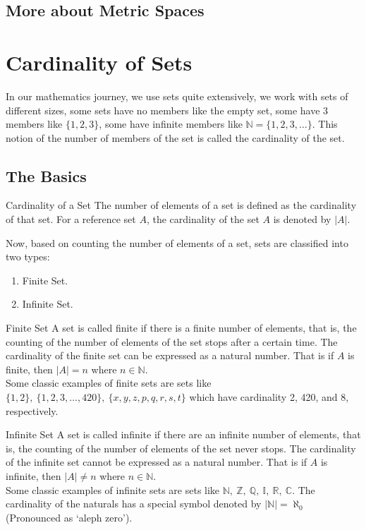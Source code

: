 \subsection{More about Metric Spaces}
\section{Cardinality of Sets}
In our mathematics journey, we use sets quite extensively, we work with sets of different sizes, some sets have no members like the empty set, some have 3 members like $\{1,2,3\}$, some have infinite members like $\mathbb{N}=\{1,2,3,\dots\}$. This notion of the number of members of the set is called the cardinality of the set.
\subsection{The Basics}
\begin{Definition}{Cardinality of a Set}\label{cardinality}
    The number of elements of a set is defined as the cardinality of that set. For a reference set $A$, the cardinality of the set $A$ is denoted by $|A|$.
\end{Definition}
\noindent Now, based on counting the number of elements of a set, sets are classified into two types:
\begin{enumerate}
    \item Finite Set.
    \item Infinite Set.
\end{enumerate}
\begin{Definition}{Finite Set}\label{finite_set}
    A set is called finite if there is a finite number of elements, that is, the counting of the number of elements of the set stops after a certain time. The cardinality of the finite set can be expressed as a natural number. That is if $A$ is finite, then $|A|=n$ where $n\in\mathbb{N}$.\\ Some classic examples of finite sets are sets like $\{1,2\},\ \{1,2,3,\dots,420\},\ \{x,y,z,p,q,r,s,t\}$ which have cardinality 2, 420, and 8, respectively.
\end{Definition}
\begin{Definition}{Infinite Set}\label{infinite_set}
    A set is called infinite if there are an infinite number of elements, that is, the counting of the number of elements of the set never stops. The cardinality of the infinite set cannot be expressed as a natural number. That is if $A$ is infinite, then $|A|\neq n$ where $n\in\mathbb{N}$.\\
    Some classic examples of infinite sets are sets like $\mathbb{N,\ Z,\ Q,\ I,\ R,\ C}$. The cardinality of the naturals has a special symbol denoted by $|\mathbb{N}|=\aleph_0$ (Pronounced as `aleph zero').
\end{Definition}
